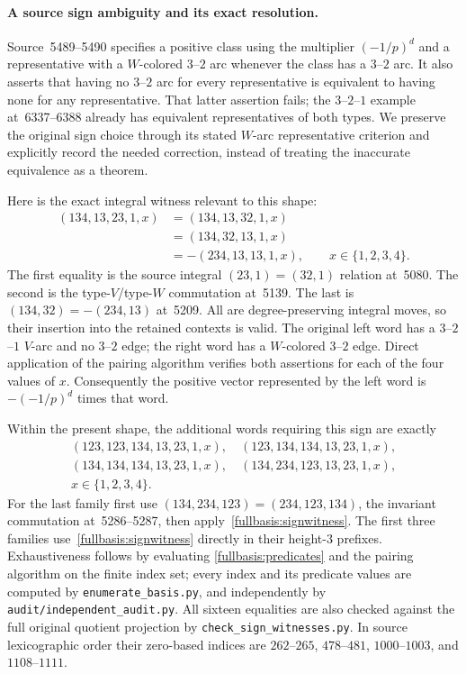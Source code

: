 \paragraph{A source sign ambiguity and its exact resolution.}
Source~5489--5490 specifies a positive class using the multiplier
$(-1/p)^d$ and a representative with a $W$-colored $3$--$2$ arc whenever
the class has a $3$--$2$ arc.  It also asserts that having no $3$--$2$
arc for every representative is equivalent to having none for any
representative.  That latter assertion fails; the $3$--$2$--$1$ example
at~6337--6388 already has equivalent representatives of both types.
We preserve the original sign choice through its stated
$W$-arc representative criterion and explicitly record the needed
correction, instead of treating the inaccurate equivalence as a theorem.

Here is the exact integral witness relevant to this shape:
\begin{equation}\label{fullbasis:signwitness}
 \begin{aligned}
 (134,13,23,1,x)
 &=(134,13,32,1,x)\\
 &=(134,32,13,1,x)\\
 &=-(234,13,13,1,x),\qquad x\in\{1,2,3,4\}.
 \end{aligned}
\end{equation}
The first equality is the source integral $(23,1)=(32,1)$ relation
at~5080.  The second is the type-$V$/type-$W$ commutation at~5139.
The last is $(134,32)=-(234,13)$ at~5209.  All are degree-preserving
integral moves, so their insertion into the retained contexts is valid.
The original left word has a $3$--$2$--$1$ $V$-arc and no $3$--$2$
edge; the right word has a $W$-colored $3$--$2$ edge.  Direct application
of the pairing algorithm verifies both assertions for each of the four
values of $x$.  Consequently the positive vector represented by the
left word is $-(-1/p)^d$ times that word.

Within the present shape, the additional words requiring this sign are
exactly
\[
\begin{gathered}
 (123,123,134,13,23,1,x),\quad
 (123,134,134,13,23,1,x),\\
 (134,134,134,13,23,1,x),\quad
 (134,234,123,13,23,1,x),\\
 x\in\{1,2,3,4\}.
\end{gathered}
\]
For the last family first use
$(134,234,123)=(234,123,134)$, the invariant commutation
at~5286--5287, then apply~\eqref{fullbasis:signwitness}.  The first
three families use~\eqref{fullbasis:signwitness} directly in their
height-$3$ prefixes.  Exhaustiveness follows by evaluating
\eqref{fullbasis:predicates} and the pairing algorithm on the finite
index set; every index and its predicate values are computed by
\texttt{enumerate\_basis.py}, and independently by
\texttt{audit/independent\_audit.py}.  All sixteen equalities are also
checked against the full original quotient projection by
\texttt{check\_sign\_witnesses.py}.  In source lexicographic order their
zero-based indices are $262$--$265$, $478$--$481$, $1000$--$1003$, and
$1108$--$1111$.

